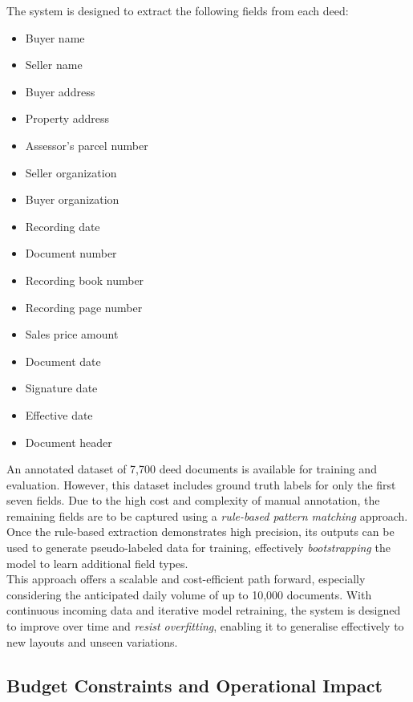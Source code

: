 \documentclass{article}
\begin{document}
The system is designed to extract the following fields from each deed:

\begin{multicols}{2}
\begin{itemize}
    \item Buyer name
    \item Seller name
    \item Buyer address
    \item Property address
    \item Assessor's parcel number
    \item Seller organization
    \item Buyer organization
    \item Recording date
    \item Document number
    \item Recording book number
    \item Recording page number
    \item Sales price amount
    \item Document date
    \item Signature date
    \item Effective date
    \item Document header
\end{itemize}
\end{multicols}

An annotated dataset of 7,700 deed documents is available for training and evaluation. However, this dataset includes ground truth labels for only the first seven fields. Due to the high cost and complexity of manual annotation, the remaining fields are to be captured using a \textit{rule-based pattern matching} approach. Once the rule-based extraction demonstrates high precision, its outputs can be used to generate pseudo-labeled data for training, effectively \textit{bootstrapping} the model to learn additional field types. \\

This approach offers a scalable and cost-efficient path forward, especially considering the anticipated daily volume of up to 10,000 documents. With continuous incoming data and iterative model retraining, the system is designed to improve over time and \textit{resist overfitting}, enabling it to generalise effectively to new layouts and unseen variations.

\subsection{Budget Constraints and Operational Impact}
\end{document}

